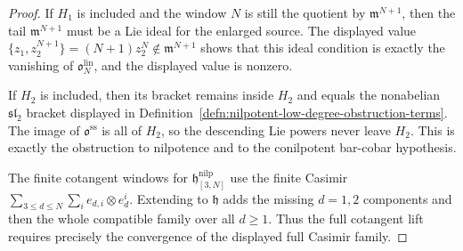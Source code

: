 \begin{proof}
  If \(H_1\) is included and the window \(N\) is still the quotient by
  \(\mathfrak m^{N+1}\), then the tail
  \(\mathfrak m^{N+1}\) must be a Lie ideal for the enlarged source.
  The displayed value
  \(\{z_1,z_2^{N+1}\}=(N+1)z_2^N\notin\mathfrak m^{N+1}\)
  shows that this ideal condition is exactly the vanishing of
  \(\mathfrak o^{\mathrm{lin}}_N\), and the displayed value is nonzero.

  If \(H_2\) is included, then its bracket remains inside \(H_2\) and
  equals the nonabelian \(\mathfrak{sl}_2\) bracket displayed in
  Definition~\ref{defn:nilpotent-low-degree-obstruction-terms}.  The
  image of \(\mathfrak o^{\mathrm{ss}}\) is all of \(H_2\), so the
  descending Lie powers never leave \(H_2\).  This is exactly the
  obstruction to nilpotence and to the conilpotent bar-cobar hypothesis.

  The finite cotangent windows for
  \(\mathfrak h^{\mathrm{nilp}}_{[3,N]}\) use the finite Casimir
  \(\sum_{3\leq d\leq N}\sum_i e_{d,i}\otimes e_d^i\).  Extending to
  \(\mathfrak h\) adds the missing \(d=1,2\) components and then the
  whole compatible family over all \(d\geq1\).  Thus the full
  cotangent lift requires precisely the convergence of the displayed
  full Casimir family.
\end{proof}

